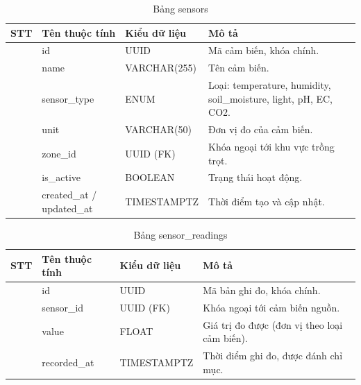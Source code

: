 \documentclass[13pt,a4paper]{extarticle}
\numberwithin{figure}{section}
\numberwithin{table}{section}
\begin{document}
	\begin{table}[H]
		\centering
		\caption{Bảng sensors}
		\label{tab:sensors}
		\begingroup
		\setlength{\tabcolsep}{3pt}
		\begin{tabularx}{\textwidth}{|>{\centering\arraybackslash}p{1cm}|>{\raggedright\arraybackslash}p{3.8cm}|>{\raggedright\arraybackslash}p{3.2cm}|Y|}
			\hline
			\centering\textbf{STT} & \centering\textbf{Tên thuộc tính} & \centering\textbf{Kiểu dữ liệu} & \centering\arraybackslash\textbf{Mô tả} \\
			 & id & UUID & Mã cảm biến, khóa chính. \\
			 & name & VARCHAR(255) & Tên cảm biến. \\
			 & sensor\_type & ENUM & Loại: temperature, humidity, soil\_moisture, light, pH, EC, CO2. \\
			 & unit & VARCHAR(50) & Đơn vị đo của cảm biến. \\
			 & zone\_id & UUID (FK) & Khóa ngoại tới khu vực trồng trọt. \\
			 & is\_active & BOOLEAN & Trạng thái hoạt động. \\
			 & created\_at / updated\_at & TIMESTAMPTZ & Thời điểm tạo và cập nhật. \\
			\hline
		\end{tabularx}
		\endgroup
	\end{table}
	
	\begin{table}[H]
		\centering
		\caption{Bảng sensor\_readings}
		\label{tab:sensor_readings}
		\begingroup
		\setlength{\tabcolsep}{3pt}
		\begin{tabularx}{\textwidth}{|>{\centering\arraybackslash}p{1cm}|>{\raggedright\arraybackslash}p{3.8cm}|>{\raggedright\arraybackslash}p{3.2cm}|Y|}
			\hline
			\centering\textbf{STT} & \centering\textbf{Tên thuộc tính} & \centering\textbf{Kiểu dữ liệu} & \centering\arraybackslash\textbf{Mô tả} \\
			 & id & UUID & Mã bản ghi đo, khóa chính. \\
			 & sensor\_id & UUID (FK) & Khóa ngoại tới cảm biến nguồn. \\
			 & value & FLOAT & Giá trị đo được (đơn vị theo loại cảm biến). \\
			 & recorded\_at & TIMESTAMPTZ & Thời điểm ghi đo, được đánh chỉ mục. \\
			\hline
		\end{tabularx}
		\endgroup
	\end{table}
	
\end{document}
